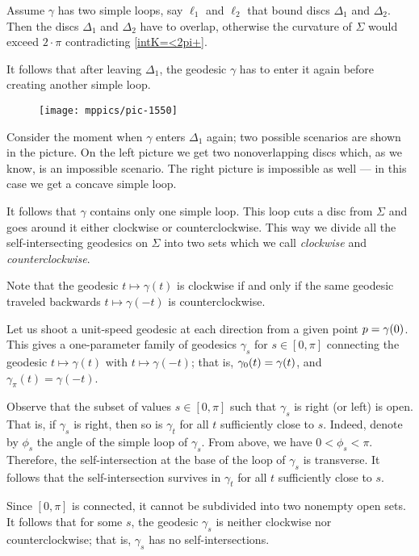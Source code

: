 Assume $\gamma$ has two simple loops, say $\ell_1$ and $\ell_2$ that bound discs $\Delta_1$ and $\Delta_2$.
Then the discs $\Delta_1$ and $\Delta_2$ have to overlap,
otherwise the curvature of $\Sigma$ would exceed $2\cdot\pi$  contradicting \ref{intK=<2pi+}.


It follows that after leaving $\Delta_1$, the geodesic $\gamma$ has to enter it again before creating another simple loop.
\begin{figure}[h!]
\vskip-0mm
\centering
\texttt{[image: mppics/pic-1550]}
\end{figure}
Consider the moment when $\gamma$ enters $\Delta_1$ again;
two possible scenarios are shown in the picture.
On the left picture we get two nonoverlapping discs which, as we know, is an impossible scenario.
The right picture is impossible as well --- in this case we get a concave simple loop.

It follows that $\gamma$ contains only one simple loop.
This loop cuts a disc from $\Sigma$ 
and goes around it either clockwise or counterclockwise.
This way we divide all the self-intersecting geodesics on $\Sigma$
into two sets which we call {}\emph{clockwise} and {}\emph{counterclockwise}.

Note that the geodesic $t\mapsto \gamma(t)$ is clockwise 
if and only if the same geodesic traveled backwards
$t\mapsto \gamma(-t)$
is counterclockwise.

Let us shoot a unit-speed geodesic at each direction from a given point $p\z=\gamma(0)$.
This gives a one-parameter family of geodesics $\gamma_s$ for $s\in[0,\pi]$ connecting the geodesic $t\mapsto \gamma(t)$ with $t\mapsto \gamma(-t)$; that is, $\gamma_0(t)\z=\gamma(t)$, and $\gamma_\pi(t)=\gamma(-t)$.

Observe that the subset of values $s\in [0,\pi]$ such that $\gamma_s$ is right (or left) is open.
That is, if $\gamma_s$ is right, then so is $\gamma_t$ for all $t$ sufficiently close to $s$.
Indeed, denote by $\phi_s$ the angle of the simple loop of $\gamma_s$.
From above, we have $0<\phi_s<\pi$.
Therefore, the self-intersection at the base of the loop of $\gamma_s$ is transverse.
It follows that the self-intersection survives in $\gamma_t$ for all $t$ sufficiently close to $s$.

Since $[0,\pi]$ is connected, it cannot be subdivided into two nonempty open sets.
It follows that for some $s$, the geodesic $\gamma_s$ is neither  clockwise nor counterclockwise;
that is, $\gamma_s$ has no self-intersections.
\qeds

